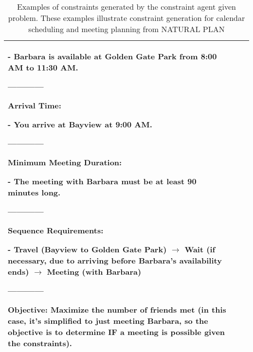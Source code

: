 \begin{table*}
\begin{tabularx}{\textwidth}{>{\raggedright}p{}|X|X}
    - Barbara is available at Golden Gate Park from 8:00 AM to 11:30 AM.

------------

Arrival Time:
    
    - You arrive at Bayview at 9:00 AM.

------------

Minimum Meeting Duration:
    
    - The meeting with Barbara must be at least 90 minutes long.

------------

Sequence Requirements:
    
    - Travel (Bayview to Golden Gate Park) $\rightarrow$ Wait (if necessary, due to arriving before Barbara's availability ends) $\rightarrow$ Meeting (with Barbara)

------------

Objective: Maximize the number of friends met (in this case, it's simplified to just meeting Barbara, so the objective is to determine IF a meeting is possible given the constraints). 

\\ \bottomrule
\end{tabularx}

\caption{Examples of constraints generated by the constraint agent given problem. These examples illustrate constraint generation for calendar scheduling and meeting planning from NATURAL PLAN}
\label{tab:np_constraints_examples}
\end{table*}